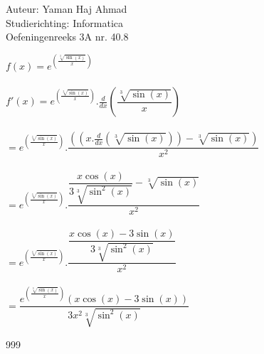 \documentclass[a4paper]{article}
\begin{document}
\noindent \large Auteur: Yaman Haj Ahmad \\
\noindent \large Studierichting: Informatica\\
\noindent \large Oefeningenreeks 3A nr. 40.8\\

\medskip

\normalsize

$f(x) = e^{\left(\tfrac{\sqrt[3]{\sin\left(x\right)}}{x}\right)}$\\\\

$f'(x) = e^{\left(\tfrac{\sqrt[3]{\sin\left(x\right)}}{x}\right)} .\frac{d}{dx}\left(\dfrac{\sqrt[3]{\sin\left(x\right)}}{x}\right)$\\\\

$= e^{\left(\tfrac{\sqrt[3]{\sin\left(x\right)}}{x}\right)} . \dfrac{\left(\left(x.\frac{d}{dx}\left(\sqrt[3]{\sin\left(x\right)}\right)\right)-\sqrt[3]{\sin\left(x\right)}\right)}{x^2}$\\\\

$= e^{\left(\tfrac{\sqrt[3]{\sin\left(x\right)}}{x}\right)} . \dfrac{\dfrac{x\cos\left(x\right)}{3\sqrt[3]{\sin^2\left(x\right)}} - \sqrt[3]{\sin\left(x\right)}}{x^2}$\\\\

$= e^{\left(\tfrac{\sqrt[3]{\sin\left(x\right)}}{x}\right)} . \dfrac{\dfrac{x\cos\left(x\right)-3\sin\left(x\right)}{3\sqrt[3]{\sin^2\left(x\right)}}}{x^2}$\\\\

$= \dfrac{e^{\left(\tfrac{\sqrt[3]{\sin\left(x\right)}}{x}\right)}\left(x\cos\left(x\right)-3\sin\left(x\right)\right)}{3x^2\sqrt[3]{\sin^2\left(x\right)}}$

\begin{thebibliography}{999}
\end{thebibliography}
\end{document}
